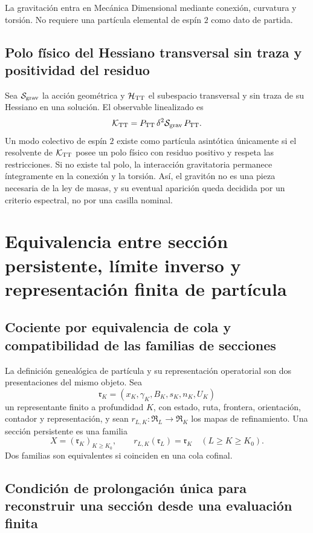 La gravitación entra en Mecánica Dimensional mediante conexión, curvatura y
torsión. No requiere una partícula elemental de espín \(2\) como dato de
partida.

\subsection{Polo físico del Hessiano transversal sin traza y positividad del residuo}

Sea \(\mathcal S_{\rm grav}\) la acción geométrica y
\(\mathcal H_{\rm TT}\) el subespacio transversal y sin traza de su Hessiano
en una solución. El observable linealizado es
\[
 \mathcal K_{\rm TT}
 =P_{\rm TT}\,\delta^2\mathcal S_{\rm grav}\,P_{\rm TT}.
\]
Un modo colectivo de espín \(2\) existe como partícula asintótica únicamente
si el resolvente de \(\mathcal K_{\rm TT}\) posee un polo físico con residuo
positivo y respeta las restricciones. Si no existe tal polo, la interacción
gravitatoria permanece íntegramente en la conexión y la torsión. Así, el
gravitón no es una pieza necesaria de la ley de masas, y su eventual aparición
queda decidida por un criterio espectral, no por una casilla nominal.

\section{Equivalencia entre sección persistente, límite inverso y representación finita de partícula}

\subsection{Cociente por equivalencia de cola y compatibilidad de las familias de secciones}

La definición genealógica de partícula y su representación operatorial son
dos presentaciones del mismo objeto. Sea
\[
 \mathfrak r_K=(x_K,\gamma_K,B_K,s_K,n_K,U_K)
\]
un representante finito a profundidad \(K\), con estado, ruta, frontera,
orientación, contador y representación, y sean
\(r_{L,K}:\mathfrak R_L\to\mathfrak R_K\) los mapas de refinamiento. Una
sección persistente es una familia
\[
 X=(\mathfrak r_K)_{K\ge K_0},
 \qquad r_{L,K}(\mathfrak r_L)=\mathfrak r_K
 \quad(L\ge K\ge K_0).
\]
Dos familias son equivalentes si coinciden en una cola cofinal.

\subsection{Condición de prolongación única para reconstruir una sección desde una evaluación finita}

